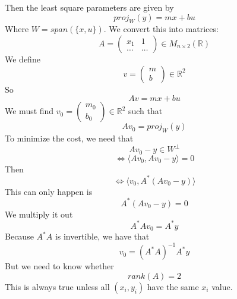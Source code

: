 \documentclass{article}
\newtheorem{one minute paper}[theorem]{One Minute Paper}
\begin{document}
Then the least square parameters are given by 
\begin{equation}
    proj_W(y) = mx + bu
\end{equation}
Where $W = span(\{x,u\})$. We convert this into matrices:
\begin{equation}
    A = \begin{pmatrix}
        x_1 & 1 \\
        \dots & \dots
    \end{pmatrix} \in M_{n \times 2}(\mathbb{R})
\end{equation}
We define
\begin{equation}
    v = \begin{pmatrix}
        m \\
        b 
    \end{pmatrix} \in \mathbb{R}^2
\end{equation}
So 
\begin{equation}
    Av = mx + bu
\end{equation}
We must find $v_0 = \begin{pmatrix}
    m_0 \\
    b_0
\end{pmatrix} \in \mathbb{R}^2$ such that 
\begin{equation}
    Av_0 = proj_W(y)
\end{equation}
To minimize the cost, we need that 
\begin{equation}
    Av_0 - y \in W^{\perp}
\end{equation}
\begin{equation}
    \iff \langle Av_0, Av_0 - y\rangle = 0 
\end{equation}
Then 
\begin{equation}
    \iff \langle v_0, A^* (A v_0 - y) \rangle
\end{equation}
This can only happen is 
\begin{equation}
    A^* (Av_0 - y) = 0
\end{equation}
We multiply it out 
\begin{equation}
    A^* A v_0 = A^* y
\end{equation}
Because $A^* A$ is invertible, we have that 
\begin{equation}
    v_0 =  (A^* A)^{-1} A^*y
\end{equation}
But we need to know whether
\begin{equation}
    rank(A) = 2
\end{equation}
This is always true unless all $(x_i, y_i)$ have the same $x_i$ value. 
\end{document}
